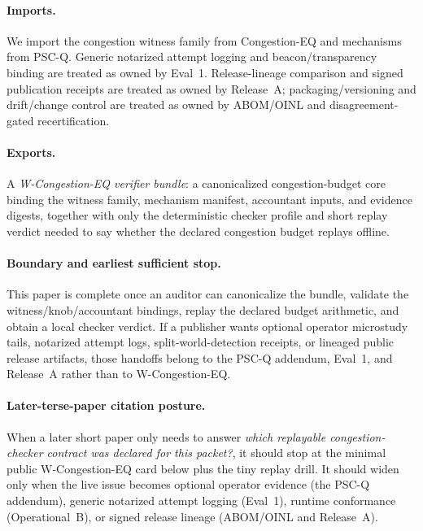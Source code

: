 \documentclass[11pt]{article}
\begin{document}
\paragraph{Imports.}
We import the congestion witness family from Congestion-EQ and mechanisms from PSC-Q.\cite{series:congeq,series:pscq}
Generic notarized attempt logging and beacon/transparency binding are treated as owned by Eval~1.\cite{series:evalnotary}
Release-lineage comparison and signed publication receipts are treated as owned by Release~A; packaging/versioning and drift/change control are treated as owned by ABOM/OINL and disagreement-gated recertification.\cite{series:release,series:abom,series:recert}

\paragraph{Exports.}
A \emph{W-Congestion-EQ verifier bundle}: a canonicalized congestion-budget core binding the witness family, mechanism manifest, accountant inputs, and evidence digests, together with only the deterministic checker profile and short replay verdict needed to say whether the declared congestion budget replays offline.

\paragraph{Boundary and earliest sufficient stop.}
This paper is complete once an auditor can canonicalize the bundle, validate the witness/knob/accountant bindings, replay the declared budget arithmetic, and obtain a local checker verdict.
If a publisher wants optional operator microstudy tails, notarized attempt logs, split-world-detection receipts, or lineaged public release artifacts, those handoffs belong to the PSC-Q addendum, Eval~1, and Release~A rather than to W-Congestion-EQ.\cite{series:pscqaddendum,series:evalnotary,series:release}

\paragraph{Later-terse-paper citation posture.}
When a later short paper only needs to answer \emph{which replayable congestion-checker contract was declared for this packet?}, it should stop at the minimal public W-Congestion-EQ card below plus the tiny replay drill.
It should widen only when the live issue becomes optional operator evidence (the PSC-Q addendum), generic notarized attempt logging (Eval~1), runtime conformance (Operational~B), or signed release lineage (ABOM/OINL and Release~A).\cite{series:pscqaddendum,series:evalnotary,series:operationalB,series:abom,series:release}
\end{document}
